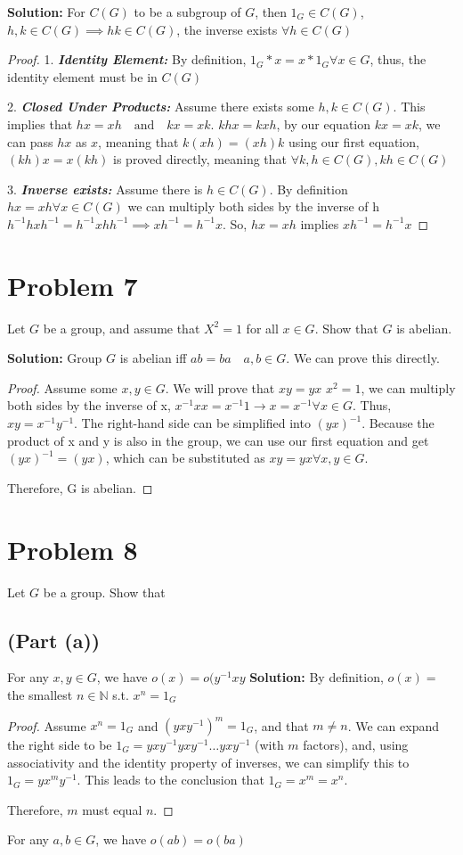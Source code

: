 \documentclass{article}
\begin{document}
\noindent \textbf{Solution:} 
For $C(G)$ to be a subgroup of $G$, then $1_G \in C(G)$, $h, k \in C(G) \implies hk \in C(G)$, the inverse exists $\forall h \in C(G)$
\begin{proof}
1. \textbf{\textit{Identity Element:}} By definition, $1_G * x = x * 1_G \forall x \in G$, thus, the identity element must be in $C(G)$

2. \textbf{\textit{Closed Under Products:}} Assume there exists some $h, k \in C(G)$. This implies that $hx=xh \quad \textrm{and} \quad kx=xk$. $khx=kxh$, by our equation $kx=xk$, we can pass $hx$ as $x$, meaning that $k(xh)=(xh)k$ using our first equation, $(kh)x = x(kh)$ is proved directly, meaning that $\forall k, h \in C(G), kh \in C(G)$

3. \textbf{\textit{Inverse exists:}} Assume there is $h \in C(G)$. By definition $hx = xh \forall x \in C(G)$ we can multiply both sides by the inverse of h $h^{-1}hxh^{-1}=h^{-1}xhh^{-1} \implies xh^{-1}=h^{-1}x$. So, $hx = xh $ implies $xh^{-1}=h^{-1}x$
\end{proof}

\section{Problem 7}
Let $G$ be a group, and assume that $X^2=1$ for all $x \in G$. Show that $G$ is abelian.

\noindent \textbf{Solution:} Group $G$ is abelian iff $ab=ba \quad a,b \in G$. We can prove this directly.
\begin{proof} Assume some $x, y \in G$. We will prove that $xy=yx$
$x^2=1$, we can multiply both sides by the inverse of x, $x^{-1}xx=x^{-1}1 \rightarrow x=x^{-1} \forall x \in G$. Thus, $xy=x^{-1}y^{-1}$. The right-hand side can be simplified into $(yx)^{-1}$. Because the product of x and y is also in the group, we can use our first equation and get $(yx)^{-1}=(yx)$, which can be substituted as $xy=yx \forall x, y \in G$.

Therefore, G is abelian.
\end{proof}

\section{Problem 8}
Let $G$ be a group. Show that

\subsection{(Part (a))}
For any $x, y \in G$, we have $o(x)=o(y^{-1}xy$
\noindent \textbf{Solution:} 
By definition, $o(x)=$ the smallest $n \in \mathbb{N}$ s.t. $x^n=1_G$
\begin{proof}
Assume $x^n = 1_G$ and $(yxy^{-1})^m = 1_G$, and that $m \neq n$. We can expand the right side to be $1_G = yxy^{-1} yxy^{-1} \ldots yxy^{-1}$ (with $m$ factors), and, using associativity and the identity property of inverses, we can simplify this to $1_G = y x^m y^{-1}$. This leads to the conclusion that $1_G = x^m = x^n$.

Therefore, $m$ must equal $n$.
\end{proof}
For any $a, b \in G$, we have $o(ab)=o(ba)$
\end{document}
